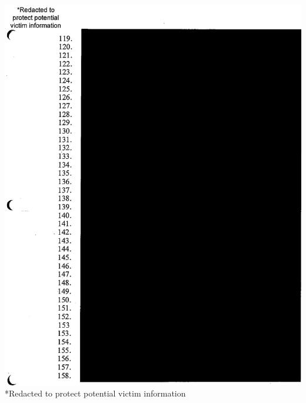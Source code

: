 \documentclass[10pt]{article}
\begin{document}
\begin{displayquote}
\includegraphics[max width=\textwidth, center]{2025_02_27_dd68c3d38de88f0516d9g-221}\\
*Redacted to protect potential victim information
\end{displayquote}
\end{document}
